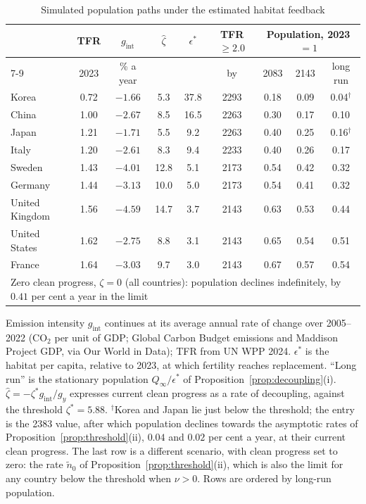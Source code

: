 \documentclass[11pt]{article}
\begin{document}
\begin{table}[h!]\centering
\begin{threeparttable}
\caption{Simulated population paths under the estimated habitat feedback}
\label{tab:proj}
\footnotesize
\setlength{\tabcolsep}{4pt}
\begin{tabular}{lcccccccc}
\toprule
 & TFR & $g_{\text{int}}$ & $\hat\zeta$ & $\epsilon^\ast$ & TFR $\ge2.0$ & \multicolumn{3}{c}{Population, 2023 $=1$}\\
\cmidrule(lr){7-9}
 & 2023 & \% a year & & & by & 2083 & 2143 & long run\\
\midrule
Korea          & 0.72 & $-1.66$ & 5.3  & 37.8 & 2293 & 0.18 & 0.09 & 0.04$^\dagger$\\
China          & 1.00 & $-2.67$ & 8.5  & 16.5 & 2263 & 0.30 & 0.17 & 0.10\\
Japan          & 1.21 & $-1.71$ & 5.5  & 9.2  & 2263 & 0.40 & 0.25 & 0.16$^\dagger$\\
Italy          & 1.20 & $-2.61$ & 8.3  & 9.4  & 2233 & 0.40 & 0.26 & 0.17\\
Sweden         & 1.43 & $-4.01$ & 12.8 & 5.1  & 2173 & 0.54 & 0.42 & 0.32\\
Germany        & 1.44 & $-3.13$ & 10.0 & 5.0  & 2173 & 0.54 & 0.41 & 0.32\\
United Kingdom & 1.56 & $-4.59$ & 14.7 & 3.7  & 2143 & 0.63 & 0.53 & 0.44\\
United States  & 1.62 & $-2.75$ & 8.8  & 3.1  & 2143 & 0.65 & 0.54 & 0.51\\
France         & 1.64 & $-3.03$ & 9.7  & 3.0  & 2143 & 0.67 & 0.57 & 0.54\\
\midrule
\multicolumn{9}{l}{Zero clean progress, $\zeta=0$ (all countries): population declines indefinitely, by $0.41$ per cent a year in the limit}\\
\bottomrule
\end{tabular}
\begin{tablenotes}\footnotesize
\item Emission intensity $g_{\text{int}}$ continues at its average annual rate of change over 2005--2022
(CO$_2$ per unit of GDP; Global Carbon Budget emissions and Maddison Project GDP, via Our World in Data); TFR from UN WPP 2024. $\epsilon^\ast$ is the habitat
per capita, relative to 2023, at which fertility reaches replacement. ``Long run'' is the stationary
population $Q_\infty/\epsilon^\ast$ of Proposition~\ref{prop:decoupling}(i). $\hat\zeta=-\zeta^\ast g_{\text{int}}/g_y$ expresses current clean progress as a
rate of decoupling, against the threshold $\zeta^\ast=5.88$. $^\dagger$Korea and Japan lie
just below the threshold; the entry is the 2383 value, after which population declines towards the
asymptotic rates of Proposition~\ref{prop:threshold}(ii), $0.04$ and $0.02$ per cent a year, at
their current clean progress. The last row is a different scenario, with clean progress set to zero:
the rate $\tilde n_0$ of Proposition~\ref{prop:threshold}(ii), which is also the limit for any country
below the threshold when $\nu>0$. Rows are ordered by long-run population.
\end{tablenotes}
\end{threeparttable}
\end{table}
\end{document}
